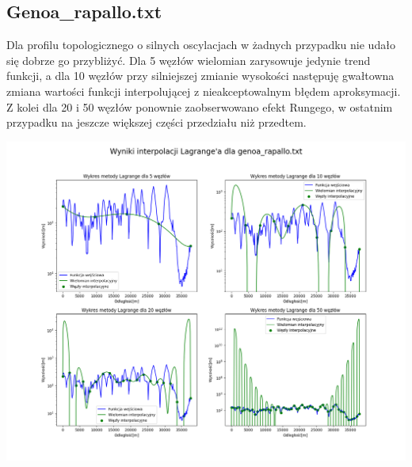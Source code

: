 \documentclass[a4paper,12pt]{article}
\begin{document}
   	\subsection{Genoa\_rapallo.txt}
	Dla profilu topologicznego o silnych oscylacjach w żadnych przypadku nie udało się dobrze go przybliżyć. Dla 5 węzłów wielomian zarysowuje jedynie trend funkcji, a dla 10 węzłów przy silniejszej zmianie wysokości następuję gwałtowna zmiana wartości funkcji interpolującej z nieakceptowalnym błędem aproksymacji. Z kolei dla 20 i 50 węzłów ponownie zaobserwowano efekt Rungego, w ostatnim przypadku na jeszcze większej części przedziału niż przedtem.
	\begin{center}
        \includegraphics[scale=0.4]{../charts/lagrange_genoa_rapallo.png}
    \end{center}
    
    \newpage
\end{document}
